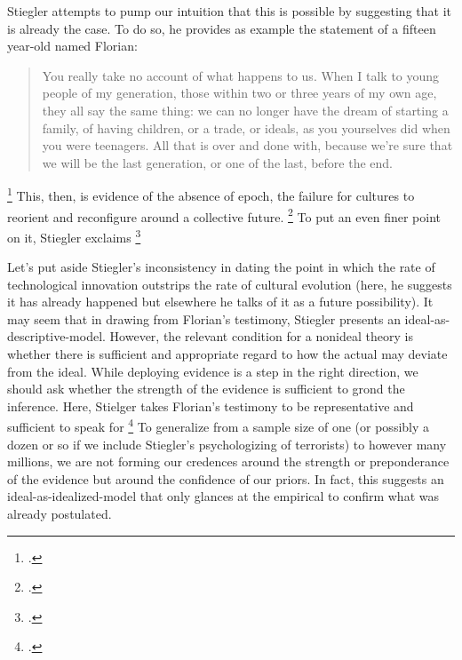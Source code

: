 \documentclass[letterpaper,notitlepage,12pt]{article}
\begin{document}
Stiegler attempts to pump our intuition that this is possible by suggesting that
it is already the case.
To do so, he provides as example the statement of a fifteen year-old named
Florian: \blockquote{You really take no account of what happens to us. When I
  talk to young people of my generation, those within two or three years of my
  own age, they all say the same thing: we can no longer have the dream of
  starting a family, of having children, or a trade, or ideals, as you
  yourselves did when you were teenagers. All that is over and done with,
  because we're sure that we will be the last generation, or one of the last,
before the end.}\footcite[ch. 1.5]{stiegler_age_2019}
This, then, is evidence of the absence of epoch, the failure for cultures to
reorient and reconfigure around a collective future. \footcite[ch. 2.6]{stiegler_age_2019}
To put an even finer point on it, Stiegler exclaims \footcite[ch.
2.6]{stiegler_age_2019}

Let's put aside Stiegler's inconsistency in dating the point in which the rate
of technological innovation outstrips the rate of cultural evolution (here, he
suggests it has already happened but elsewhere he talks of it as a future
possibility). It may seem that in drawing from Florian's testimony, Stiegler
presents an ideal-as-descriptive-model.
However, the relevant condition for a nonideal theory is whether there is
sufficient and appropriate regard to how the actual may deviate from the ideal.
While deploying evidence is a step in the right direction, we should ask whether
the strength of the evidence is sufficient to grond the inference.
Here, Stielger takes Florian's testimony to be representative and sufficient to
speak for \footcite[ch.
1.5]{stiegler_age_2019}
To generalize from a sample size of one (or possibly a dozen or so if we include
Stiegler's psychologizing of terrorists) to however many millions, we are not
forming our credences around the strength or preponderance of the evidence but
around the confidence of our priors.
In fact, this suggests an ideal-as-idealized-model that only glances at the
empirical to confirm what was already postulated.
\end{document}
